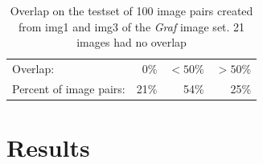 \documentclass[conference]{IEEEtran}
\begin{document}
\begin{table}
	\centering
	\small
\begin{tabular}{l*{3}{r}}
	Overlap: & 0\% & $< 50$\% & $> 50$\%  \\
	\noalign{\smallskip}
	Percent of image pairs: & 21\% & 54\% & 25\% \\
\end{tabular}
\caption{Overlap on the testset of 100 image pairs created from img1 and 
img3 of the \emph{Graf} image set. 21 images had no overlap}
\label{table:overlap}
\end{table}
\section{Results}
\label{results}

\begin{figure}
\end{figure}
\end{document}
